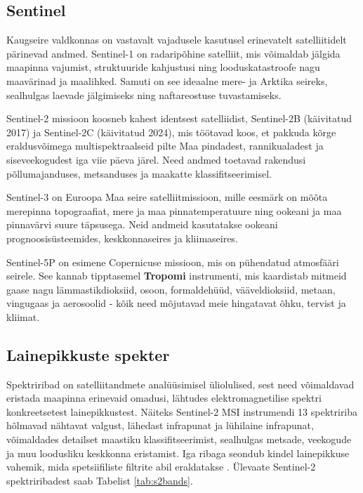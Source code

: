 \subsection{Sentinel}
Kaugseire valdkonnas on vastavalt vajadusele kasutusel erinevatelt satelliitidelt pärinevad andmed. Sentinel-1 on radaripõhine satelliit, mis võimaldab jälgida maapinna vajumist,
struktuuride kahjustusi ning looduskatastroofe nagu maavärinad ja maalihked. Samuti on
see ideaalne mere- ja Arktika seireks, sealhulgas laevade jälgimiseks ning
naftareostuse tuvastamiseks. \cite{S1Applications}

Sentinel-2 missioon koosneb kahest identsest satelliidist, Sentinel-2B
(käivitatud 2017) ja Sentinel-2C (käivitatud 2024), mis töötavad koos, et
pakkuda kõrge eraldusvõimega multispektraalseid pilte Maa pindadest,
rannikualadest ja siseveekogudest iga viie päeva järel. Need andmed toetavad
rakendusi põllumajanduses, metsanduses ja maakatte klassifitseerimisel. \cite{S2Applications}

Sentinel-3 on Euroopa Maa seire satelliitmissioon, mille eesmärk on mõõta
merepinna topograafiat, mere ja maa pinnatemperatuure ning ookeani ja maa
pinnavärvi suure täpsusega. Neid andmeid kasutatakse ookeani prognoosisüsteemides,
keskkonnaseires ja kliimaseires. \cite{S3Mission}

Sentinel-5P on esimene Copernicuse missioon, mis on pühendatud atmosfääri
seirele. See kannab tipptasemel \textbf{Tropomi} instrumenti, mis kaardistab mitmeid
gaase nagu lämmastikdioksiid, osoon, formaldehüüd, vääveldioksiid, metaan,
vingugaas ja aerosoolid - kõik need mõjutavad meie hingatavat õhku, tervist ja
kliimat. \cite{S5PApplications}
\subsection{Lainepikkuste spekter}
Spektriribad on satelliitandmete analüüsimisel üliolulised, sest need
võimaldavad eristada maapinna erinevaid omadusi, lähtudes elektromagnetilise
spektri konkreetsetest lainepikkustest. Näiteks Sentinel-2 MSI instrumendi 13
spektririba hõlmavad nähtavat valgust, lähedast infrapunat ja lühilaine
infrapunat, võimaldades detailset maastiku klassifitseerimist, sealhulgas
metsade, veekogude ja muu loodusliku keskkonna eristamist. Iga ribaga seondub
kindel lainepikkuse vahemik, mida spetsiifiliste filtrite abil eraldatakse \cite{S2Mission}.
Ülevaate Sentinel-2 spektriribadest saab Tabelist \ref{tab:s2bands}.
\bigskip

